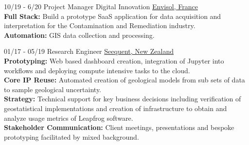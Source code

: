 \documentclass[]{friggeri-cv}
\begin{document}
\begin{entrylist}
 	\entry
	{10/19 - 6/20}
	{Project Manager Digital Innovation}
	{\href{http://envisol.net/}{Envisol, France}}
	{
	\\[-0.5em]
	\textbf{Full Stack: } Build a prototype SaaS application for data acquisition and interpretation for the Contamination and Remediation industry.
	\\[3pt]
	\textbf{Automation: } GIS data collection and processing.
	}
  
 	\entry
    {01/17 - 05/19}
    {Research Engineer}
    {\href{https://www.seequent.com/}{Seequent, New Zealand}}
    {
    \\[-0.5em]
   	\textbf{Prototyping: }Web based dashboard creation, integration of Jupyter into workflows and deploying compute intensive tasks to the cloud.
   	\\[3pt]
   	\textbf{Core IP Reuse: }Automated creation of geological models from sub sets of data to sample geological uncertainty.
    \\[3pt]
   	\textbf{Strategy: }Technical support for key business decisions including verification of geostatistical implementations and creation of infrastructure to obtain and analyze usage metrics of Leapfrog software. 
    \\[3pt]
	\textbf{Stakeholder Communication: }Client meetings, presentations and bespoke prototyping facilitated by mixed background.
	}
  

    

\end{entrylist}
\end{document}
